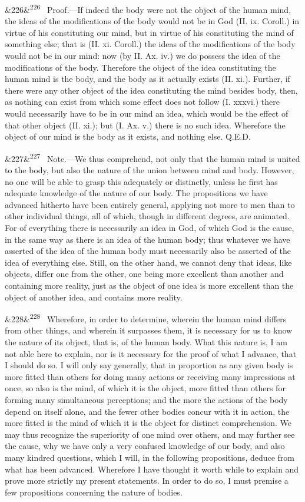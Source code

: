 \documentclass[12pt]{article}
\newcommand{\para}[1][]{\par\noindent\ifx&#1&\else\textsuperscript{\footnotesize #1}~\fi}
\begin{document}
\para[226] Proof.---If indeed the body were not the object of the human mind, the ideas of the modifications of the body would not be in God (II. ix. Coroll.) in virtue of his constituting our mind, but in virtue of his constituting the mind of something else; that is (II. xi. Coroll.) the ideas of the modifications of the body would not be in our mind: now (by II. Ax. iv.) we do possess the idea of the modifications of the body. Therefore the object of the idea constituting the human mind is the body, and the body as it actually exists (II. xi.). Further, if there were any other object of the idea constituting the mind besides body, then, as nothing can exist from which some effect does not follow (I. xxxvi.) there would necessarily have to be in our mind an idea, which would be the effect of that other object (II. xi.); but (I. Ax. v.) there is no such idea. Wherefore the object of our mind is the body as it exists, and nothing else. Q.E.D.

\para[227] Note.---We thus comprehend, not only that the human mind is united to the body, but also the nature of the union between mind and body. However, no one will be able to grasp this adequately or distinctly, unless he first has adequate knowledge of the nature of our body. The propositions we have advanced hitherto have been entirely general, applying not more to men than to other individual things, all of which, though in different degrees, are animated. For of everything there is necessarily an idea in God, of which God is the cause, in the same way as there is an idea of the human body; thus whatever we have asserted of the idea of the human body must necessarily also be asserted of the idea of everything else. Still, on the other hand, we cannot deny that ideas, like objects, differ one from the other, one being more excellent than another and containing more reality, just as the object of one idea is more excellent than the object of another idea, and contains more reality.

\para[228] Wherefore, in order to determine, wherein the human mind differs from other things, and wherein it surpasses them, it is necessary for us to know the nature of its object, that is, of the human body. What this nature is, I am not able here to explain, nor is it necessary for the proof of what I advance, that I should do so. I will only say generally, that in proportion as any given body is more fitted than others for doing many actions or receiving many impressions at once, so also is the mind, of which it is the object, more fitted than others for forming many simultaneous perceptions; and the more the actions of the body depend on itself alone, and the fewer other bodies concur with it in action, the more fitted is the mind of which it is the object for distinct comprehension. We may thus recognize the superiority of one mind over others, and may further see the cause, why we have only a very confused knowledge of our body, and also many kindred questions, which I will, in the following propositions, deduce from what has been advanced. Wherefore I have thought it worth while to explain and prove more strictly my present statements. In order to do so, I must premise a few propositions concerning the nature of bodies.
\end{document}
